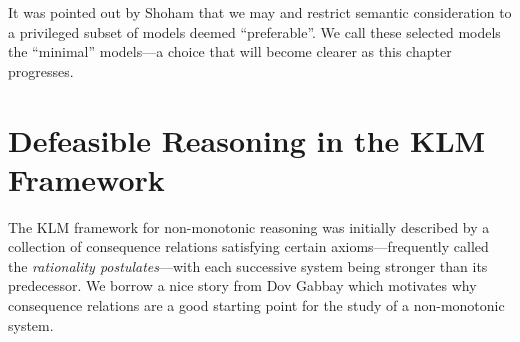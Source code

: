 It was pointed out by Shoham \cite{shohamSemanticApproach} that we may  and restrict semantic consideration to a privileged subset of models deemed ``preferable''. We call these selected models the ``minimal'' models---a choice that will become clearer as this chapter progresses.




\section{Defeasible Reasoning in the KLM Framework}
The KLM framework for non-monotonic reasoning was initially described by a collection of consequence relations satisfying certain axioms---frequently called the \textit{rationality postulates}---with each successive system being stronger than its predecessor. We borrow a nice story from Dov Gabbay \cite{gabbay1985theoreticalFoundations} which motivates why consequence relations are a good starting point for the study of a non-monotonic system.

